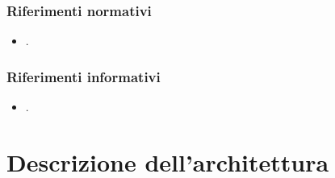 \subsubsection{Riferimenti normativi}
\begin{itemize}
\item .
\end{itemize}

\subsubsection{Riferimenti informativi}
\begin{itemize}
\item .
\end{itemize} 

\section{Descrizione dell'architettura}

